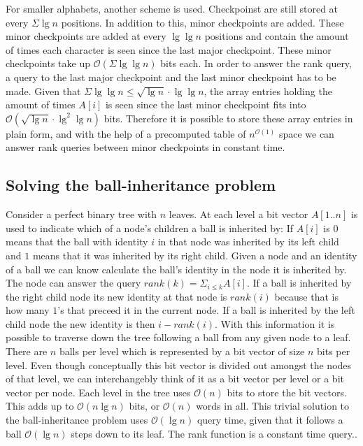 For smaller alphabets, another scheme is used. Checkpoinst are still stored at every $\Sigma \lg n$ positions. In addition to this, minor checkpoints are added. These minor checkpoints are added at every $\lg \lg n$ positions and contain the amount of times each character is seen since the last major checkpoint. These minor checkpoints take up $\mathcal{O}(\Sigma \lg \lg n)$ bits each. In order to answer the rank query, a query to the last major checkpoint and the last minor checkpoint has to be made. Given that $\Sigma \lg \lg n \leq \sqrt{\lg n} \cdot \lg \lg n$, the array entries holding the amount of times $A[i]$ is seen since the last minor checkpoint fits into $\mathcal{O}(\sqrt{\lg n} \cdot \lg^2 \lg n)$ bits. Therefore it is possible to store these array entries in plain form, and with the help of a precomputed table of $n^{\mathcal{O}(1)}$ space we can answer rank queries between minor checkpoints in constant time.  


\subsection{Solving the ball-inheritance problem} 
\label{ssection:solving-ball}

Consider a perfect binary tree with $n$ leaves. At each level a bit vector $A[1..n]$ is used to indicate which of a node's children a ball is inherited by: If $A[i]$ is $0$ means that the ball with identity $i$ in that node was inherited by its left child and $1$ means that it was inherited by its right child. Given a node and an identity of a ball we can know calculate the ball's identity in the node it is inherited by. The node can answer the query $rank(k) = \Sigma_{i \leq k} A[i]$. If a ball is inherited by the right child node its new identity at that node is $rank(i)$ because that is how many $1$'s that preceed it in the current node. If a ball is inherited by the left child node the new identity is then $i-rank(i)$. With this information it is possible to traverse down the tree following a ball from any given node to a leaf. There are $n$ balls per level which is represented by a bit vector of size $n$ bits per level. Even though conceptually this bit vector is divided out amongst the nodes of that level, we can interchangebly think of it as a bit vector per level or a bit vector per node. Each level in the tree uses $\mathcal{O}(n)$ bits to store the bit vectors. This adds up to $\mathcal{O}(n \lg n)$ bits, or $\mathcal{O}(n)$ words in all. This trivial solution to the ball-inheritance problem uses $\mathcal{O}(\lg n)$ query time, given that it follows a ball $\mathcal{O}(\lg n)$ steps down to its leaf. The rank function is a constant time query.. \\


